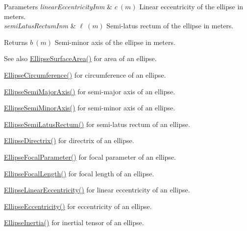 \begin{DoxyParams}{Parameters}
{\em linear\+Eccentricity\+Inm} & $ c\ (m)$ Linear eccentricity of the ellipse in meters. \\
\hline
{\em semi\+Latus\+Rectum\+Inm} & $ \ell\ (m)$ Semi-\/latus rectum of the ellipse in meters. \\
\hline
\end{DoxyParams}
\begin{DoxyReturn}{Returns}
$ b\ (m)$ Semi-\/minor axis of the ellipse in meters. 
\end{DoxyReturn}
\begin{DoxySeeAlso}{See also}
\mbox{\hyperlink{group___e_g_x_math-_geometry-2_d-_ellipse-_surface_area_ga4ce8c8323e9718ce5458f4ab7f6d823d}{Ellipse\+Surface\+Area()}} for area of an ellipse. 

\mbox{\hyperlink{group___e_g_x_math-_geometry-2_d-_ellipse-_circumference_ga4172802ac674eb53467b44928ac635c7}{Ellipse\+Circumference()}} for circumference of an ellipse. 

\mbox{\hyperlink{group___e_g_x_math-_geometry-2_d-_ellipse-_semi_major_axis_ga646a2ca065f4ac3f666a9ea22f3bb527}{Ellipse\+Semi\+Major\+Axis()}} for semi-\/major axis of an ellipse. 

\mbox{\hyperlink{group___e_g_x_math-_geometry-2_d-_ellipse-_semi_minor_axis_gae461acf3333565d69527dd86e9aa2b32}{Ellipse\+Semi\+Minor\+Axis()}} for semi-\/minor axis of an ellipse. 

\mbox{\hyperlink{group___e_g_x_math-_geometry-2_d-_ellipse-_semi_latus_rectum_gacfd1844eb4ef3d1ee3c0b460a6442ae6}{Ellipse\+Semi\+Latus\+Rectum()}} for semi-\/latus rectum of an ellipse. 

\mbox{\hyperlink{group___e_g_x_math-_geometry-2_d-_ellipse-_directrix_gace8f72a8efbc9c18d3eb689151405106}{Ellipse\+Directrix()}} for directrix of an ellipse. 

\mbox{\hyperlink{group___e_g_x_math-_geometry-2_d-_ellipse-_focal_parameter_ga4cd01a38c72c092ef9791351948bf69b}{Ellipse\+Focal\+Parameter()}} for focal parameter of an ellipse. 

\mbox{\hyperlink{group___e_g_x_math-_geometry-2_d-_ellipse-_focal_length_gab8d63de7640c880cfecaeada6f2afdac}{Ellipse\+Focal\+Length()}} for focal length of an ellipse. 

\mbox{\hyperlink{group___e_g_x_math-_geometry-2_d-_ellipse-_linear_eccentricity_gac70b3010e30aa8b73deb50fe2b9b9a91}{Ellipse\+Linear\+Eccentricity()}} for linear eccentricity of an ellipse. 

\mbox{\hyperlink{group___e_g_x_math-_geometry-2_d-_ellipse-_eccentricity_ga6a0a7fba17f782616894cfc447628c33}{Ellipse\+Eccentricity()}} for eccentricity of an ellipse. 

\mbox{\hyperlink{group___e_g_x_math-_geometry-2_d-_ellipse-_inertia_ga10a3049c2f04b50f271fb01dc62e4cf8}{Ellipse\+Inertia()}} for inertial tensor of an ellipse. 
\end{DoxySeeAlso}
